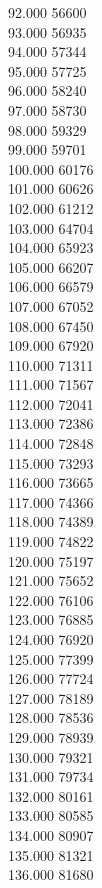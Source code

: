 { 92.000	56600 \\
 93.000	56935 \\
 94.000	57344 \\
 95.000	57725 \\
 96.000	58240 \\
 97.000	58730 \\
 98.000	59329 \\
 99.000	59701 \\
 100.000	60176 \\
 101.000	60626 \\
 102.000	61212 \\
 103.000	64704 \\
 104.000	65923 \\
 105.000	66207 \\
 106.000	66579 \\
 107.000	67052 \\
 108.000	67450 \\
 109.000	67920 \\
 110.000	71311 \\
 111.000	71567 \\
 112.000	72041 \\
 113.000	72386 \\
 114.000	72848 \\
 115.000	73293 \\
 116.000	73665 \\
 117.000	74366 \\
 118.000	74389 \\
 119.000	74822 \\
 120.000	75197 \\
 121.000	75652 \\
 122.000	76106 \\
 123.000	76885 \\
 124.000	76920 \\
 125.000	77399 \\
 126.000	77724 \\
 127.000	78189 \\
 128.000	78536 \\
 129.000	78939 \\
 130.000	79321 \\
 131.000	79734 \\
 132.000	80161 \\
 133.000	80585 \\
 134.000	80907 \\
 135.000	81321 \\
 136.000	81680 \\
}
